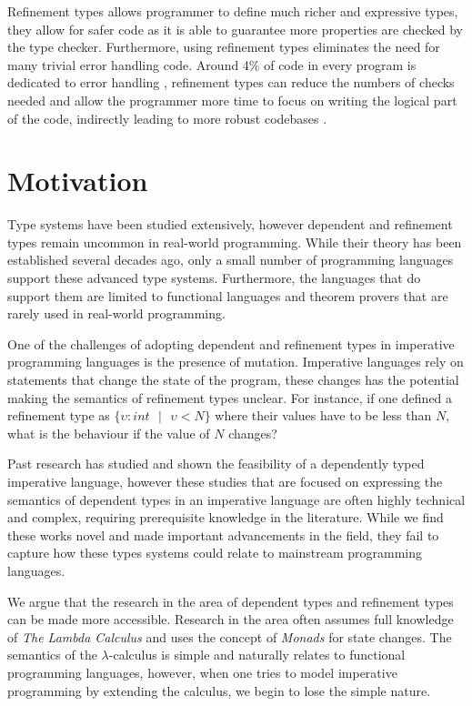 \documentclass[a4paper,12pt]{report}
\begin{document}
\par
Refinement types allows programmer to define much richer and expressive types, 
they allow for safer code as it is able to guarantee more properties are 
checked by the type checker. Furthermore, using refinement types 
eliminates the need for many trivial error handling code. Around 4\% of 
code in every program is dedicated to error handling \cite{errorHandlingCode}, 
refinement types can reduce the numbers of checks needed and allow the 
programmer more time to focus on writing the logical part of the code, indirectly 
leading to more robust codebases \cite{elimArrayCheck}.

\section{Motivation}
Type systems have been studied extensively, however dependent and refinement types 
remain uncommon in real-world programming. While their theory has been 
established several decades ago, only a small number of programming languages 
support these advanced type systems. Furthermore, the languages that do support 
them are limited to functional languages and theorem provers that are rarely 
used in real-world programming.

\par
One of the challenges of adopting dependent and refinement types 
in imperative programming languages is the presence of mutation. Imperative 
languages rely on statements that change the state of the program, these 
changes has the potential making the semantics of refinement types unclear. 
For instance, if one defined a refinement type as 
$\{\upsilon : int\text{ }|\text{ }\upsilon < N\}$ where their values have to be 
less than $N$, what is the behaviour if the value of $N$ changes?

\par
Past research has studied and shown the feasibility of a dependently typed 
imperative language, however these studies that are focused on expressing 
the semantics of dependent types in an imperative language are often highly 
technical and complex, requiring prerequisite knowledge in the literature. While 
we find these works novel and made important advancements in the field, 
they fail to capture how these types systems could relate to 
mainstream programming languages.

\par
We argue that the research in the area of dependent types and refinement 
types can be made more accessible. Research in the area often assumes full 
knowledge of \textit{The Lambda Calculus} \cite{lambdaCalculus} and uses 
the concept of \textit{Monads} \cite{monads} for state changes. The semantics 
of the $\lambda$-calculus is simple and naturally 
relates to functional programming languages, however, when one tries to model 
imperative programming by extending the calculus, we begin to lose the simple 
nature. 
\end{document}
